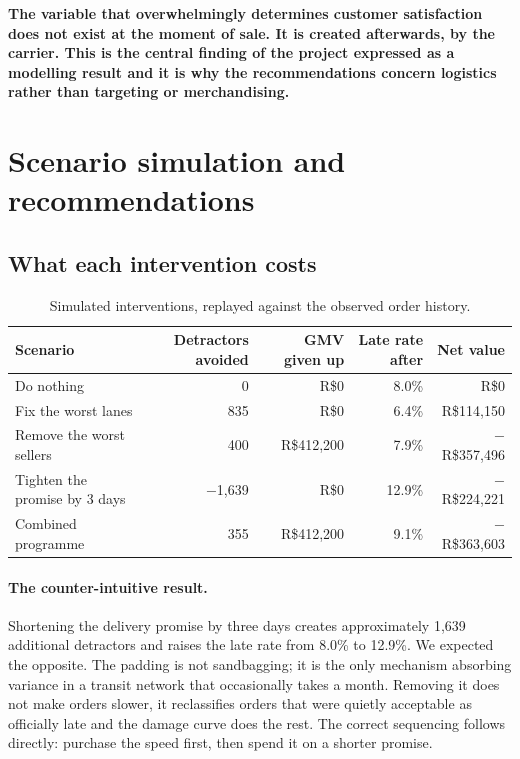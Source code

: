 \documentclass[11pt,a4paper]{article}
\newcommand{\finding}[1]{%
  \par\vspace{0.6em}%
  \noindent\begin{minipage}{\textwidth}%
  \setlength{\fboxsep}{9pt}%
  \noindent\colorbox{wash}{\begin{minipage}{\dimexpr\textwidth-2\fboxsep\relax}%
  \color{ink}\textbf{#1}%
  \end{minipage}}%
  \end{minipage}\par\vspace{0.6em}%
}
\newcommand{\R}{R\$}
\begin{document}
\finding{The variable that overwhelmingly determines customer satisfaction does not
exist at the moment of sale. It is created afterwards, by the carrier. This is the
central finding of the project expressed as a modelling result and it is why the
recommendations concern logistics rather than targeting or merchandising.}

\section{Scenario simulation and recommendations}

\subsection{What each intervention costs}

\begin{table}[H]
\centering
\small
\caption{Simulated interventions, replayed against the observed order history.}
\label{tab:scenarios}
\begin{tabular}{@{}lrrrr@{}}
\toprule
\textbf{Scenario} & \textbf{Detractors avoided} & \textbf{GMV given up} &
\textbf{Late rate after} & \textbf{Net value}\\
\midrule
Do nothing & 0 & \R{}0 & 8.0\% & \R{}0\\
Fix the worst lanes & 835 & \R{}0 & 6.4\% & \R{}114{,}150\\
Remove the worst sellers & 400 & \R{}412{,}200 & 7.9\% & $-$\R{}357{,}496\\
Tighten the promise by 3 days & $-$1{,}639 & \R{}0 & 12.9\% & $-$\R{}224{,}221\\
Combined programme & 355 & \R{}412{,}200 & 9.1\% & $-$\R{}363{,}603\\
\bottomrule
\end{tabular}
\end{table}

\paragraph{The counter-intuitive result.} Shortening the delivery promise by three
days creates approximately 1{,}639 additional detractors and raises the late rate
from 8.0\% to 12.9\%. We expected the opposite. The padding is not sandbagging; it
is the only mechanism absorbing variance in a transit network that occasionally
takes a month. Removing it does not make orders slower, it reclassifies orders that
were quietly acceptable as officially late and the damage curve does the rest. The
correct sequencing follows directly: purchase the speed first, then spend it on a
shorter promise.
\end{document}
